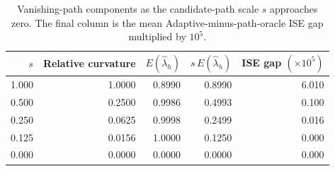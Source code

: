 \begin{table}[p]
\centering
\small
\caption{Vanishing-path components as the candidate-path scale $s$ approaches zero. The final column is the mean Adaptive-minus-path-oracle ISE gap multiplied by $10^5$.}
\label{tab:sim-vanishing}
\begin{tabular}{@{}rrrrr@{}}
\toprule
$s$ & Relative curvature & $E(\widehat\lambda_h)$ &
$s\,E(\widehat\lambda_h)$ & ISE gap $(\times10^5)$ \\
\midrule
1.000 & 1.0000 & 0.8990 & 0.8990 & 6.010 \\
0.500 & 0.2500 & 0.9986 & 0.4993 & 0.100 \\
0.250 & 0.0625 & 0.9998 & 0.2499 & 0.016 \\
0.125 & 0.0156 & 1.0000 & 0.1250 & 0.000 \\
0.000 & 0.0000 & 0.0000 & 0.0000 & 0.000 \\
\bottomrule
\end{tabular}
\end{table}
